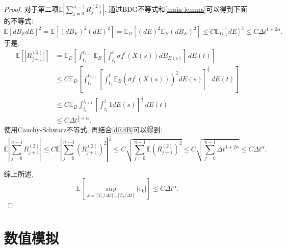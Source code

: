 \begin{proof}
	对于第二项$\mathbb{E}|\sum\limits_{j=0}^{n-1}R_{j+1}^{(2)}|$, 
	通过BDG不等式和\cref{main lemma}可以得到下面的不等式:
	\begin{equation}\label{dEdB}
		\mathbb{E}[dB_EdE]^2=\mathbb{E}[(dB_E)^2(dE)^2]=\mathbb{E}_D[(dE)^2\mathbb{E}_B(dB_E)^2]\leq
		C\mathbb{E}_{D}[dE]^3\leq C\Delta t ^{1+2\alpha}. 
	\end{equation}
	于是, 
	\begin{align*}
		\mathbb{E} \left[|R_{j+1}^{(2)}| \right] &= \mathbb{E}_D \left[
		\int_{t_i}^{t_{i+1}} \mathbb{E}_B  \left[\int_{t_i}^{t}  \sigma f^{\prime}(X(s)) dB_{E(s)}\right] \, dE(t)
		\right] \\
		& \le C\mathbb{E}_D \left[
		\int_{t_i}^{t_{i+1}} \left[\int_{t_i}^{t}  \mathbb{E}_B\left(\sigma f^{\prime}(X(s))\right)^2 dE(s)\right]^{\frac{1}{2}} \, dE(t)
		\right] \\
		&\le C \mathbb{E}_D 
		\int_{t_i}^{t_{i+1}} \left[\int_{t_i}^{t}  1 dE(s)\right]^{\frac{1}{2}} \, dE(t)\\
		&\le C\Delta t^{\frac{1}{2}+\alpha}. 
	\end{align*}
	使用Cauchy-Schwarz不等式, 再结合\cref{dEdB}可以得到:
	\begin{equation*}
		\mathbb{E}\left|\sum_{j=0}^{n-1}R_{j+1}^{(2)}\right|  \le C\mathbb{E} \left|\sum_{j=0}^{n-1}(R_{j+1}^{(2)})^2\right|^{\frac{1}{2}} \le C\sqrt{\sum_{j=0}^{n-1}\mathbb{E}(R_{j+1}^{(2)})^2}
		\le C\sqrt{\sum_{j=0}^{n-1}\Delta t^{1+2\alpha}} \le C\Delta t^{\alpha}. 
	\end{equation*}
	
	综上所述, $$\mathbb{E}\left[\sup\limits_{k=\lceil T_1/\Delta t \rceil \ldots \lceil T_2/\Delta t \rceil}\left|e_k\right|\right] \leq C\Delta t^\alpha. $$
\end{proof}

\section{数值模拟}

